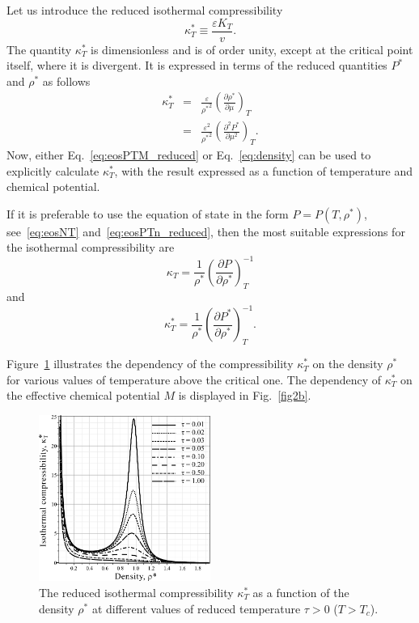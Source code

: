 Let us introduce the reduced isothermal compressibility
\begin{equation}
	\kappa^*_T \equiv \frac{\varepsilon K_T}{v}.
\end{equation}
The quantity $\kappa^*_T$ is dimensionless and is of order unity, except at the critical point itself, where it is divergent. It is expressed in terms of the reduced quantities $P^*$ and $\rho^*$ as follows
\begin{eqnarray}
	\kappa^*_T & = & \frac{\varepsilon}{{\rho^*}^2} \left(\frac{\partial \rho^*}{\partial \mu}\right)_T
	\nonumber\\
	& = & \frac{\varepsilon^2}{{\rho^*}^2} \left(\frac{\partial^2 P^*}{\partial \mu^2}\right)_T.
\end{eqnarray}
Now, either Eq.~\eqref{eq:eosPTM_reduced} or Eq.~\eqref{eq:density} can be used to explicitly calculate $\kappa^*_T$, with the result expressed as a function of temperature and chemical potential.

If it is preferable to use the equation of state in the form $P=P(T, \rho^*)$, see~\eqref{eq:eosNT} and~\eqref{eq:eosPTn_reduced}, then the most suitable expressions for the isothermal compressibility are
\begin{equation}
	\kappa_T = \frac{1}{\rho^*} \left(\frac{\partial P}{\partial \rho^*}\right)^{-1}_T
\end{equation}
and 
\begin{equation}
	\kappa^*_T = \frac{1}{\rho^*} \left(\frac{\partial P^*}{\partial \rho^*}\right)^{-1}_T.
\end{equation}

Figure~\ref{fig2a} illustrates the dependency of the compressibility $\kappa^*_T$ on the density $\rho^*$ for various values of temperature above the critical one. The dependency of $\kappa^*_T$ on the effective chemical potential $M$ is displayed in Fig.~\ref{fig2b}.

\begin{figure}[htbp]
	\includegraphics[width=0.5\textwidth]{f2a.pdf}
	\caption{The reduced isothermal compressibility $\kappa^*_T$ as a function of the density $\rho^*$ at different values of reduced temperature $\tau > 0$ ($T > T_c$). 
	}
	\label{fig2a}
\end{figure}

